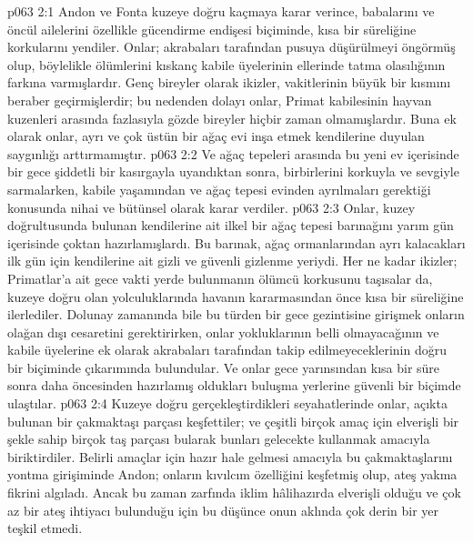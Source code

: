 \vs p063 2:1 Andon ve Fonta kuzeye doğru kaçmaya karar verince, babalarını ve öncül ailelerini özellikle gücendirme endişesi biçiminde, kısa bir süreliğine korkularını yendiler. Onlar; akrabaları tarafından pusuya düşürülmeyi öngörmüş olup, böylelikle ölümlerini kıskanç kabile üyelerinin ellerinde tatma olasılığının farkına varmışlardır. Genç bireyler olarak ikizler, vakitlerinin büyük bir kısmını beraber geçirmişlerdir; bu nedenden dolayı onlar, Primat kabilesinin hayvan kuzenleri arasında fazlasıyla gözde bireyler hiçbir zaman olmamışlardır. Buna ek olarak onlar, ayrı ve çok üstün bir ağaç evi inşa etmek kendilerine duyulan saygınlığı arttırmamıştır.
\vs p063 2:2 Ve ağaç tepeleri arasında bu yeni ev içerisinde bir gece şiddetli bir kasırgayla uyandıktan sonra, birbirlerini korkuyla ve sevgiyle sarmalarken, kabile yaşamından ve ağaç tepesi evinden ayrılmaları gerektiği konusunda nihai ve bütünsel olarak karar verdiler.
\vs p063 2:3 Onlar, kuzey doğrultusunda bulunan kendilerine ait ilkel bir ağaç tepesi barınağını yarım gün içerisinde çoktan hazırlamışlardı. Bu barınak, ağaç ormanlarından ayrı kalacakları ilk gün için kendilerine ait gizli ve güvenli gizlenme yeriydi. Her ne kadar ikizler; Primatlar’a ait gece vakti yerde bulunmanın ölümcü korkusunu taşısalar da, kuzeye doğru olan yolculuklarında havanın kararmasından önce kısa bir süreliğine ilerlediler. Dolunay zamanında bile bu türden bir gece gezintisine girişmek onların olağan dışı cesaretini gerektirirken, onlar yokluklarının belli olmayacağının ve kabile üyelerine ek olarak akrabaları tarafından takip edilmeyeceklerinin doğru bir biçiminde çıkarımında bulundular. Ve onlar gece yarınsından kısa bir süre sonra daha öncesinden hazırlamış oldukları buluşma yerlerine güvenli bir biçimde ulaştılar.
\vs p063 2:4 Kuzeye doğru gerçekleştirdikleri seyahatlerinde onlar, açıkta bulunan bir çakmaktaşı parçası keşfettiler; ve çeşitli birçok amaç için elverişli bir şekle sahip birçok taş parçası bularak bunları gelecekte kullanmak amacıyla biriktirdiler. Belirli amaçlar için hazır hale gelmesi amacıyla bu çakmaktaşlarını yontma girişiminde Andon; onların kıvılcım özelliğini keşfetmiş olup, ateş yakma fikrini algıladı. Ancak bu zaman zarfında iklim hâlihazırda elverişli olduğu ve çok az bir ateş ihtiyacı bulunduğu için bu düşünce onun aklında çok derin bir yer teşkil etmedi.
